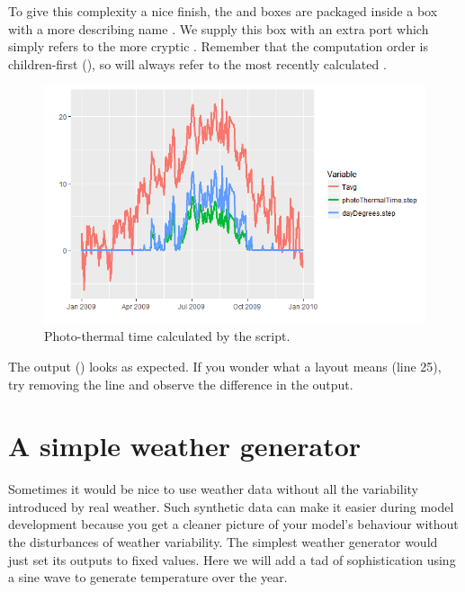 To give this complexity a nice finish, the  and  boxes are packaged inside a box with a more describing name . We supply this box with an extra port  which simply refers to the more cryptic . Remember that the computation order is children-first (), so  will always refer to the most recently calculated .

\begin{figure}
\centering
\includegraphics[width=\textwidth]{graphics/photo-thermal-plot1}
\caption{Photo-thermal time calculated by the  script.}
\label{fig:photo-thermal-plot1}
\end{figure}

The output () looks as expected. If you wonder what a  layout means (line 25), try removing the line and observe the difference in the output.

\section {A simple weather generator}

Sometimes it would be nice to use weather data without all the variability introduced by real weather. Such synthetic data can make it easier during model development because you get a cleaner picture of your model's behaviour without the disturbances of weather variability. The simplest weather generator would just set its outputs to fixed values. Here we will add a tad of sophistication using a sine wave to generate temperature over the year.

